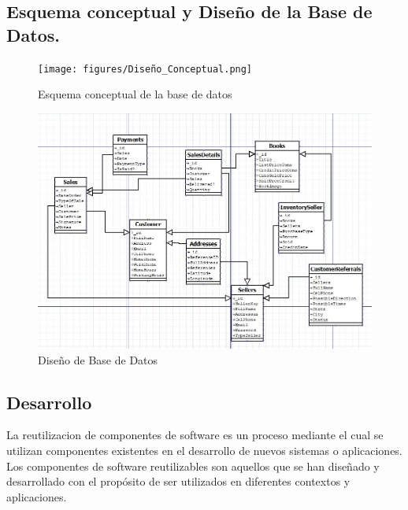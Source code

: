 \documentclass[runningheads]{llncs}
\begin{document}
\subsection{Esquema conceptual y Diseño de la Base de Datos.}
\begin{figure}[H]
	\centering\captionsetup{width=0.8\textwidth}
	\texttt{[image: figures/Diseño\_Conceptual.png]}
	\caption{Esquema conceptual de la base de datos} \label{fig5}
\end{figure}
\begin{figure}[H]
	\centering\captionsetup{width=0.8\textwidth}
	\includegraphics[width=1\textwidth]{figures/DB Diagram.jpg}
	\caption{Diseño de Base de Datos} \label{fig6}
\end{figure}

\subsection{Desarrollo}

La reutilizacion de componentes de software es un proceso mediante el cual se utilizan componentes existentes en el desarrollo de nuevos sistemas o aplicaciones. Los componentes de software reutilizables son aquellos que se han diseñado y desarrollado con el propósito de ser utilizados en diferentes contextos y aplicaciones.
\end{document}
